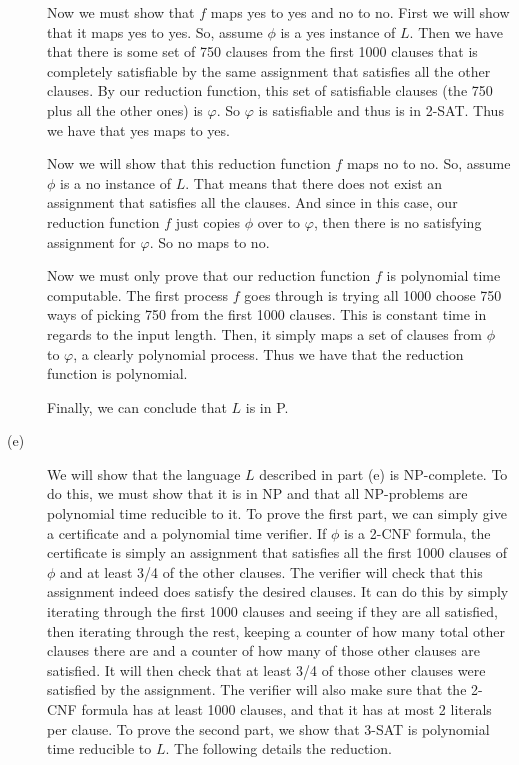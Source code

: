 \documentclass{article}
\begin{document}
\begin{description}
        Now we must show that $f$ maps yes to yes and no to no. First we will
        show that it maps yes to yes. So, assume $\phi$ is a yes instance
        of $L$. Then we have that there is some set of 750 clauses from the
        first 1000 clauses that is completely satisfiable by the same assignment
        that satisfies all the other clauses. By our reduction function, this
        set of satisfiable clauses (the 750 plus all the other ones)
        is $\varphi$. So $\varphi$ is satisfiable
        and thus is in 2-SAT. Thus we have that yes maps to yes.

        Now we will show that this reduction function $f$ maps no to no. So,
        assume $\phi$ is a no instance of $L$. That means that there does
        not exist an assignment that satisfies all the clauses. And since
        in this case, our reduction function $f$ just copies $\phi$ over to
        $\varphi$, then there is no satisfying assignment for $\varphi$. So
        no maps to no.

        Now we must only prove that our reduction function $f$ is polynomial
        time computable. The first process $f$ goes through is trying all
        1000 choose 750 ways of picking 750 from the first 1000 clauses. This
        is constant time in regards to the input length. Then, it simply maps
        a set of clauses from $\phi$ to $\varphi$, a clearly polynomial
        process. Thus we have that the reduction function is polynomial.

        Finally, we can conclude that $L$ is in P.
    \item[(e)]
        We will show that the language $L$ described in part (e) is NP-complete.
        To do this, we must show that it is in NP and that all NP-problems
        are polynomial time reducible to it. To prove the first part, we can
        simply give a certificate and a polynomial time verifier.
        If $\phi$ is a 2-CNF formula, the
        certificate is simply an assignment that satisfies all the first
        1000 clauses of $\phi$ and at least 3/4 of the other clauses. The
        verifier will check that this assignment indeed does satisfy the
        desired clauses. It can do this by simply iterating through the first
        1000 clauses and seeing if they are all satisfied, then iterating
        through the rest, keeping a counter of how many total other clauses
        there are and a counter of how many of those other clauses are
        satisfied. It will then check that at least 3/4 of those other clauses
        were satisfied by the assignment. The verifier will also make sure
        that the 2-CNF formula has at least 1000 clauses, and that it has
        at most 2 literals per clause. To prove the second part, we show that
        3-SAT is polynomial time reducible to $L$. The following details the
        reduction.


\end{description}
\end{document}
